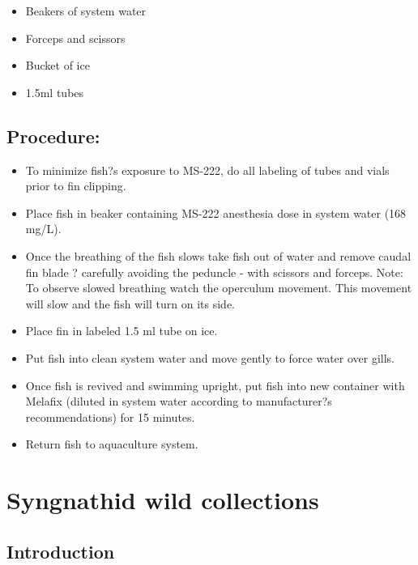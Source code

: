 \documentclass[
  letterpaper,
  DIV=11,
  numbers=noendperiod]{scrreprt}
\providecommand{\tightlist}{%
  \setlength{\itemsep}{0pt}\setlength{\parskip}{0pt}}\usepackage{longtable,booktabs,array}
\begin{document}
\begin{itemize}
\tightlist
\item
  Beakers of system water
\item
  Forceps and scissors
\item
  Bucket of ice
\item
  1.5ml tubes
\end{itemize}

\hypertarget{procedure-38}{%
\section{Procedure:}\label{procedure-38}}

\begin{itemize}
\tightlist
\item
  To minimize fish?s exposure to MS-222, do all labeling of tubes and
  vials prior to fin clipping.
\item
  Place fish in beaker containing MS-222 anesthesia dose in system water
  (168 mg/L).
\item
  Once the breathing of the fish slows take fish out of water and remove
  caudal fin blade ? carefully avoiding the peduncle - with scissors and
  forceps. Note: To observe slowed breathing watch the operculum
  movement. This movement will slow and the fish will turn on its side.
\item
  Place fin in labeled 1.5 ml tube on ice.
\item
  Put fish into clean system water and move gently to force water over
  gills.
\item
  Once fish is revived and swimming upright, put fish into new container
  with Melafix (diluted in system water according to manufacturer?s
  recommendations) for 15 minutes.
\item
  Return fish to aquaculture system.
\end{itemize}

\hypertarget{sec-vert_exp-sygnathid_collections}{%
\chapter{Syngnathid wild
collections}\label{sec-vert_exp-sygnathid_collections}}

\hypertarget{introduction-43}{%
\section{Introduction}\label{introduction-43}}
\end{document}
